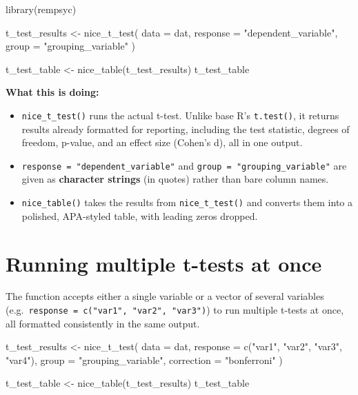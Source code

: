 \documentclass[
  letterpaper,
  DIV=11,
  numbers=noendperiod]{scrreprt}
\newenvironment{Shaded}{\begin{snugshade}}{\end{snugshade}}
\newcommand{\AttributeTok}[1]{\textcolor[rgb]{0.40,0.45,0.13}{#1}}
\newcommand{\FunctionTok}[1]{\textcolor[rgb]{0.28,0.35,0.67}{#1}}
\newcommand{\NormalTok}[1]{\textcolor[rgb]{0.00,0.23,0.31}{#1}}
\newcommand{\OtherTok}[1]{\textcolor[rgb]{0.00,0.23,0.31}{#1}}
\newcommand{\StringTok}[1]{\textcolor[rgb]{0.13,0.47,0.30}{#1}}
\begin{document}
\begin{Shaded}
\begin{Highlighting}[]
\FunctionTok{library}\NormalTok{(rempsyc)}

\NormalTok{t\_test\_results }\OtherTok{\textless{}{-}} \FunctionTok{nice\_t\_test}\NormalTok{(}
  \AttributeTok{data =}\NormalTok{ dat,}
  \AttributeTok{response =} \StringTok{"dependent\_variable"}\NormalTok{,}
  \AttributeTok{group =} \StringTok{"grouping\_variable"}
\NormalTok{)}

\NormalTok{t\_test\_table }\OtherTok{\textless{}{-}} \FunctionTok{nice\_table}\NormalTok{(t\_test\_results)}
\NormalTok{t\_test\_table}
\end{Highlighting}
\end{Shaded}

\textbf{What this is doing:}

\begin{itemize}
\item
  \texttt{nice\_t\_test()} runs the actual t-test. Unlike base R's
  \texttt{t.test()}, it returns results already formatted for reporting,
  including the test statistic, degrees of freedom, p-value, and an
  effect size (Cohen's d), all in one output.
\item
  \texttt{response\ =\ "dependent\_variable"} and
  \texttt{group\ =\ "grouping\_variable"} are given as \textbf{character
  strings} (in quotes) rather than bare column names.
\item
  \texttt{nice\_table()} takes the results from \texttt{nice\_t\_test()}
  and converts them into a polished, APA-styled table, with leading
  zeros dropped.
\end{itemize}

\section{Running multiple t-tests at
once}\label{running-multiple-t-tests-at-once}

The function accepts either a single variable or a vector of several
variables (e.g.~\texttt{response\ =\ c("var1",\ "var2",\ "var3")}) to
run multiple t-tests at once, all formatted consistently in the same
output.

\begin{Shaded}
\begin{Highlighting}[]
\NormalTok{t\_test\_results }\OtherTok{\textless{}{-}} \FunctionTok{nice\_t\_test}\NormalTok{(}
  \AttributeTok{data =}\NormalTok{ dat,}
  \AttributeTok{response =} \FunctionTok{c}\NormalTok{(}\StringTok{"var1"}\NormalTok{, }\StringTok{"var2"}\NormalTok{, }\StringTok{"var3"}\NormalTok{, }\StringTok{"var4"}\NormalTok{),}
  \AttributeTok{group =} \StringTok{"grouping\_variable"}\NormalTok{,}
  \AttributeTok{correction =} \StringTok{"bonferroni"}
\NormalTok{)}

\NormalTok{t\_test\_table }\OtherTok{\textless{}{-}} \FunctionTok{nice\_table}\NormalTok{(t\_test\_results)}
\NormalTok{t\_test\_table}
\end{Highlighting}
\end{Shaded}
\end{document}
